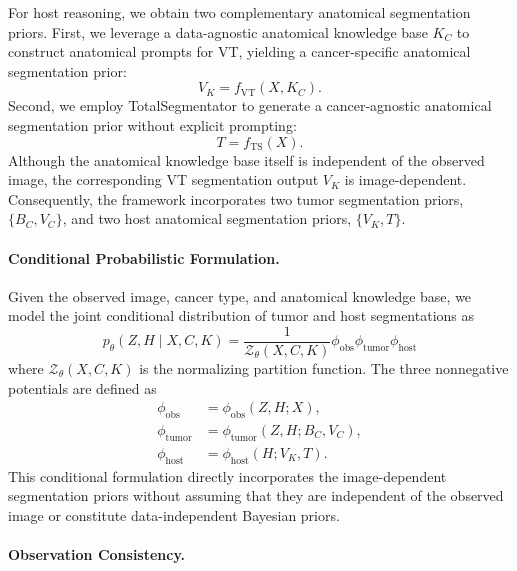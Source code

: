 \documentclass[fleqn,10pt]{olplainarticle}
\begin{document}
For host reasoning, we obtain two complementary
anatomical segmentation priors.
First, we leverage a data-agnostic anatomical
knowledge base $K_C$ to construct anatomical
prompts for VT, yielding a cancer-specific
anatomical segmentation prior:
\begin{equation}
\label{eq:kb_prior}
V_K = f_{\mathrm{VT}}(X,K_C).
\end{equation}
Second, we employ TotalSegmentator to
generate a cancer-agnostic anatomical segmentation
prior without explicit prompting:
\begin{equation}
\label{eq:ts_prior}
T = f_{\mathrm{TS}}(X).
\end{equation}
Although the anatomical knowledge base itself
is independent of the observed image, the
corresponding VT segmentation output $V_K$
is image-dependent.
Consequently, the framework incorporates
two tumor segmentation priors,
$\{B_C,V_C\}$, and two host anatomical
segmentation priors, $\{V_K,T\}$.

\paragraph{Conditional Probabilistic Formulation.}

Given the observed image, cancer type,
and anatomical knowledge base, we model
the joint conditional distribution of
tumor and host segmentations as
\begin{equation}
\label{eq:conditional_joint}
\boxed{
p_\theta(Z,H\mid X,C,K)
=
\frac{1}{\mathcal{Z}_\theta(X,C,K)}
\phi_{\mathrm{obs}}
\phi_{\mathrm{tumor}}
\phi_{\mathrm{host}}
}
\end{equation}
where $\mathcal{Z}_\theta(X,C,K)$ is the
normalizing partition function.
The three nonnegative potentials are defined as
\begin{equation}
\label{eq:reasoning_potentials}
\begin{aligned}
\phi_{\mathrm{obs}}
&=
\phi_{\mathrm{obs}}(Z,H;X),\\
\phi_{\mathrm{tumor}}
&=
\phi_{\mathrm{tumor}}(Z,H;B_C,V_C),\\
\phi_{\mathrm{host}}
&=
\phi_{\mathrm{host}}(H;V_K,T).
\end{aligned}
\end{equation}
This conditional formulation directly
incorporates the image-dependent segmentation
priors without assuming that they are
independent of the observed image or
constitute data-independent Bayesian priors.

\paragraph{Observation Consistency.}
\end{document}
